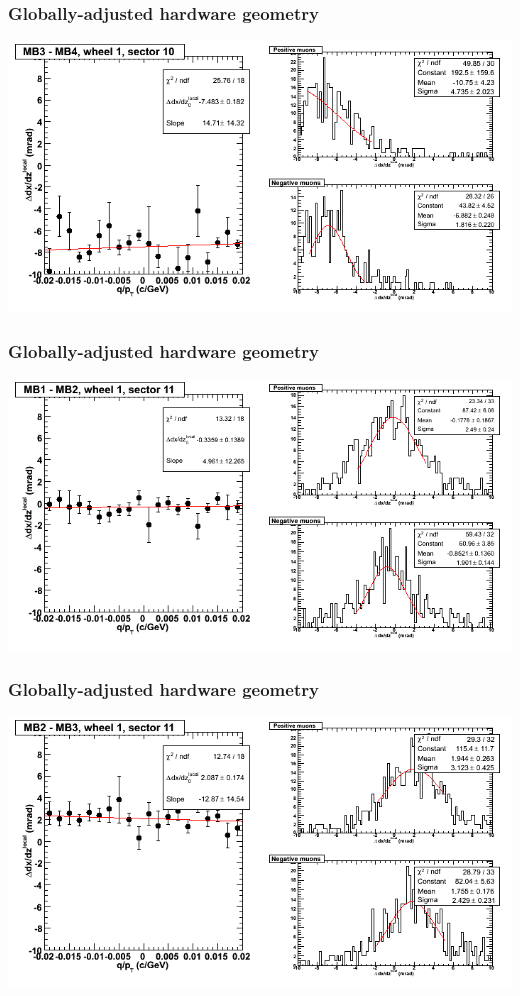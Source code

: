\documentclass[compress]{beamer}
\begin{document}
\begin{frame}
\frametitle{Globally-adjusted hardware geometry}
\includegraphics[width=\linewidth]{NOV4_segdiffs_HW/dt13_slope_D_10_34.png}
\end{frame}

\begin{frame}
\frametitle{Globally-adjusted hardware geometry}
\includegraphics[width=\linewidth]{NOV4_segdiffs_HW/dt13_slope_D_11_12.png}
\end{frame}

\begin{frame}
\frametitle{Globally-adjusted hardware geometry}
\includegraphics[width=\linewidth]{NOV4_segdiffs_HW/dt13_slope_D_11_23.png}
\end{frame}
\end{document}
